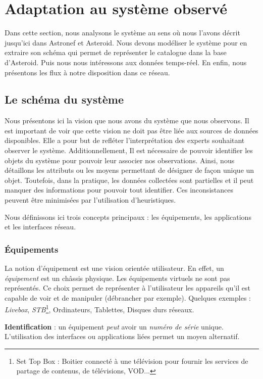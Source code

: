 \section{Adaptation au système observé}\label{sec:valid:domvision:systeme}
Dans cette section, nous analysons le système au sens où nous l'avons décrit jusqu'ici dans Astronef et Asteroid. Nous devons modéliser le système pour en extraire son schéma qui permet de représenter le catalogue dans la base d'Asteroid. Puis nous nous intéressons aux données temps-réel. En enfin, nous présentons les flux à notre disposition dans ce réseau.

\subsection{Le schéma du système}
Nous présentons ici la vision que nous avons du système que nous observons. Il est important de voir que cette vision ne doit pas être liée aux sources de données disponibles. Elle a pour but de refléter l'interprétation des experts souhaitant observer le système. Additionnellement, Il est nécessaire de pouvoir identifier les objets du système pour pouvoir leur associer nos observations. Ainsi, nous détaillons les attributs ou les moyens permettant de désigner de façon unique un objet. Toutefois, dans la pratique, les données collectées sont partielles et il peut manquer des informations pour pouvoir tout identifier. Ces inconsistances peuvent être minimisées par l'utilisation d'heuristiques.

Nous définissons ici trois concepts principaux : les équipements, les applications et les interfaces réseau.

\subsubsection{Équipements}
La notion d'équipement est une vision orientée utilisateur. En effet, un \textit{équipement} est un châssis physique. Les équipements virtuels ne sont pas représentés. Ce choix permet de représenter à l'utilisateur les appareils qu'il est capable de voir et de manipuler (débrancher par exemple). Quelques exemples : \textit{Livebox}, \textit{STB}\footnote{Set Top Box : Boitier connecté à une télévision pour fournir les services de partage de contenus, de télévisions, VOD...}, Ordinateurs, Tablettes, Disques durs réseaux.

\textbf{Identification} : un équipement \textit{peut} avoir un \textit{numéro de série} unique. L'utilisation des interfaces ou applications liées permet un moyen alternatif.

